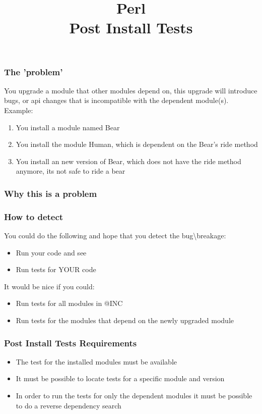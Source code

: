 \documentclass[10pt]{beamer}
\title{Perl \\ Post Install Tests}
\begin{document}
\begin{frame}
\titlepage
\end{frame}


\begin{frame}
\frametitle{The 'problem'}
You upgrade a module that other modules depend on, this upgrade will introduce bugs, or api changes that is incompatible with the dependent module(s).
Example:
\begin{enumerate}
  \item You install a module named Bear
  \item You install the module Human, which is dependent on the Bear's ride method
  \item You install an new version of Bear, which does not have the ride method anymore, its not safe to ride a bear
\end{enumerate}
\end{frame}

\begin{frame}
\frametitle{Why this is a problem}

\end{frame}

\begin{frame}
\frametitle{How to detect}
You could do the following and hope that you detect the bug\textbackslash breakage:
\begin{itemize}
\item Run your code and see
\item Run tests for YOUR code
\end{itemize}
\vspace{5 mm}
It would be nice if you could:
\begin{itemize}
\item Run tests for all modules in @INC 
\item Run tests for the modules that depend on the newly upgraded module
\end{itemize}
\end{frame}

\begin{frame}
\frametitle{Post Install Tests Requirements}
\begin{itemize}
\item The test for the installed modules must be available
\item It must be possible to locate tests for a specific module and version
\item In order to run the tests for only the dependent modules it must be possible to do a reverse dependency search
\end{itemize}
\end{frame}
\end{document}

